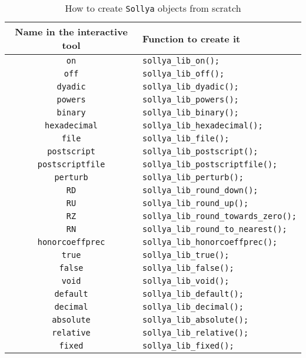 \documentclass[a4paper]{article}
\newcommand{\sollya}{\texttt{Sollya}\xspace}
\begin{document}
\begin{table}[htp]
  \caption{How to create \sollya objects from scratch}
  \label{creating_sollya_obj_t}
  \renewcommand{\footnoterule}{} %
  \begin{minipage}{\textwidth}
    \begin{center}
      \begin{tabular}{|c|l|}
    \hline
    Name in the interactive tool & \hfil \phantom{\Large{$A^A$}}Function to create it\phantom{\Large{$A^A$}}\hfil \\ \hline
\verb|on| & \verb|sollya_lib_on();| \\
\verb|off| & \verb|sollya_lib_off();| \\
\verb|dyadic| & \verb|sollya_lib_dyadic();| \\
\verb|powers| & \verb|sollya_lib_powers();| \\
\verb|binary| & \verb|sollya_lib_binary();| \\
\verb|hexadecimal| & \verb|sollya_lib_hexadecimal();| \\
\verb|file| & \verb|sollya_lib_file();| \\
\verb|postscript| & \verb|sollya_lib_postscript();| \\
\verb|postscriptfile| & \verb|sollya_lib_postscriptfile();| \\
\verb|perturb| & \verb|sollya_lib_perturb();| \\
\verb|RD| & \verb|sollya_lib_round_down();| \\
\verb|RU| & \verb|sollya_lib_round_up();| \\
\verb|RZ| & \verb|sollya_lib_round_towards_zero();| \\
\verb|RN| & \verb|sollya_lib_round_to_nearest();| \\
\verb|honorcoeffprec| & \verb|sollya_lib_honorcoeffprec();| \\
\verb|true| & \verb|sollya_lib_true();| \\
\verb|false| & \verb|sollya_lib_false();| \\
\verb|void| & \verb|sollya_lib_void();| \\
\verb|default| & \verb|sollya_lib_default();| \\
\verb|decimal| & \verb|sollya_lib_decimal();| \\
\verb|absolute| & \verb|sollya_lib_absolute();| \\
\verb|relative| & \verb|sollya_lib_relative();| \\
\verb|fixed| & \verb|sollya_lib_fixed();| \\

\end{tabular}
\end{center}
\end{minipage}
\end{table}
\end{document}
